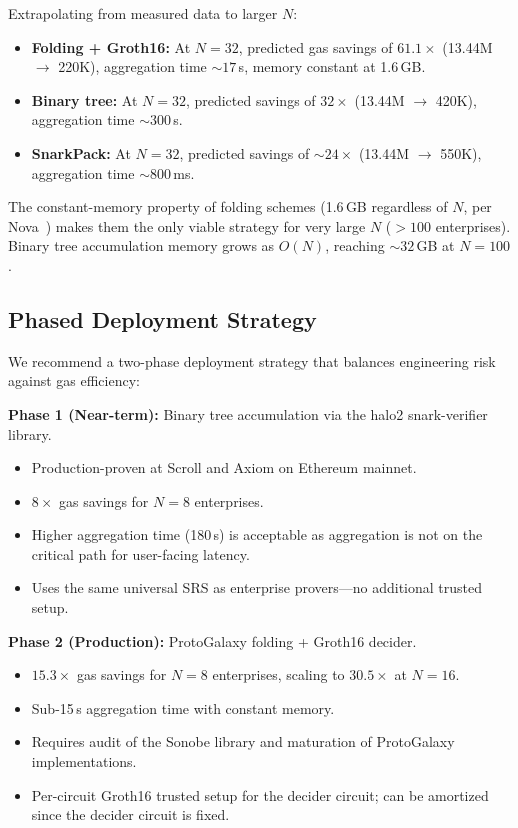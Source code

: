 Extrapolating from measured data to larger $N$:

\begin{itemize}
  \item \textbf{Folding + Groth16:} At $N{=}32$, predicted gas savings
    of $61.1\times$ (13.44M $\to$ 220K), aggregation time ${\sim}17$\,s,
    memory constant at 1.6\,GB.
  \item \textbf{Binary tree:} At $N{=}32$, predicted savings of
    $32\times$ (13.44M $\to$ 420K), aggregation time ${\sim}300$\,s.
  \item \textbf{SnarkPack:} At $N{=}32$, predicted savings of
    ${\sim}24\times$ (13.44M $\to$ 550K), aggregation time ${\sim}800$\,ms.
\end{itemize}

The constant-memory property of folding schemes (1.6\,GB regardless of
$N$, per Nova~\cite{nova}) makes them the only viable strategy for very
large $N$ ($> 100$ enterprises). Binary tree accumulation memory grows
as $O(N)$, reaching ${\sim}32$\,GB at $N{=}100$.

\subsection{Phased Deployment Strategy}
\label{sec:deployment}

We recommend a two-phase deployment strategy that balances engineering
risk against gas efficiency:

\textbf{Phase 1 (Near-term):} Binary tree accumulation via the halo2
snark-verifier library.

\begin{itemize}
  \item Production-proven at Scroll and Axiom on Ethereum mainnet.
  \item $8\times$ gas savings for $N{=}8$ enterprises.
  \item Higher aggregation time (180\,s) is acceptable as aggregation is
    not on the critical path for user-facing latency.
  \item Uses the same universal SRS as enterprise provers---no additional
    trusted setup.
\end{itemize}

\textbf{Phase 2 (Production):} ProtoGalaxy folding + Groth16 decider.

\begin{itemize}
  \item $15.3\times$ gas savings for $N{=}8$ enterprises, scaling to
    $30.5\times$ at $N{=}16$.
  \item Sub-15\,s aggregation time with constant memory.
  \item Requires audit of the Sonobe library and maturation of
    ProtoGalaxy implementations.
  \item Per-circuit Groth16 trusted setup for the decider circuit; can
    be amortized since the decider circuit is fixed.
\end{itemize}

